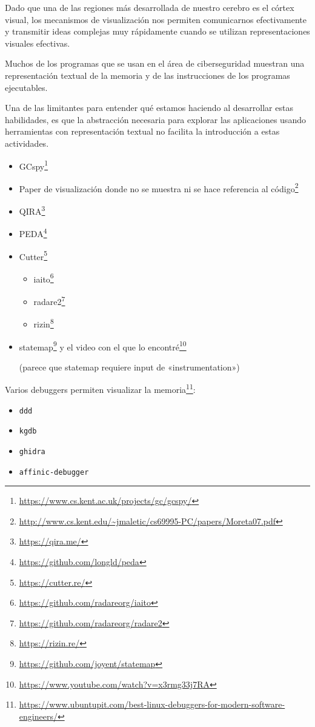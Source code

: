 \documentclass[
  12,
]{scrartcl}
\DeclareRobustCommand{\href}[2]{#2\footnote{\url{#1}}}
\providecommand{\tightlist}{%
  \setlength{\itemsep}{0pt}\setlength{\parskip}{0pt}}
\begin{document}
Dado que una de las regiones más desarrollada de nuestro cerebro es el
córtex visual, los mecanismos de visualización nos permiten comunicarnos
efectivamente y transmitir ideas complejas muy rápidamente cuando se
utilizan representaciones visuales efectivas.

Muchos de los programas que se usan en el área de ciberseguridad
muestran una representación textual de la memoria y de las instrucciones
de los programas ejecutables.

Una de las limitantes para entender qué estamos haciendo al desarrollar
estas habilidades, es que la abstracción necesaria para explorar las
aplicaciones usando herramientas con representación textual no facilita
la introducción a estas actividades.

\begin{itemize}
\item
  \href{https://www.cs.kent.ac.uk/projects/gc/gcspy/}{GCspy}
\item
  \href{http://www.cs.kent.edu/~jmaletic/cs69995-PC/papers/Moreta07.pdf}{Paper
  de visualización donde no se muestra ni se hace referencia al código}
\item
  \href{https://qira.me/}{QIRA}
\item
  \href{https://github.com/longld/peda}{PEDA}
\item
  \href{https://cutter.re/}{Cutter}

  \begin{itemize}
  \item
    \href{https://github.com/radareorg/iaito}{iaito}
  \item
    \href{https://github.com/radareorg/radare2}{radare2}
  \item
    \href{https://rizin.re/}{rizin}
  \end{itemize}
\item
  \href{https://github.com/joyent/statemap}{statemap} y
  \href{https://www.youtube.com/watch?v=x3rmg33j7RA}{el video con el que
  lo encontré}

  (parece que statemap requiere input de «instrumentation»)
\end{itemize}

\href{https://www.ubuntupit.com/best-linux-debuggers-for-modern-software-engineers/}{Varios
debuggers permiten visualizar la memoria}:

\begin{itemize}
\tightlist
\item
  \texttt{ddd}
\item
  \texttt{kgdb}
\item
  \texttt{ghidra}
\item
  \texttt{affinic-debugger}
\end{itemize}
\end{document}
